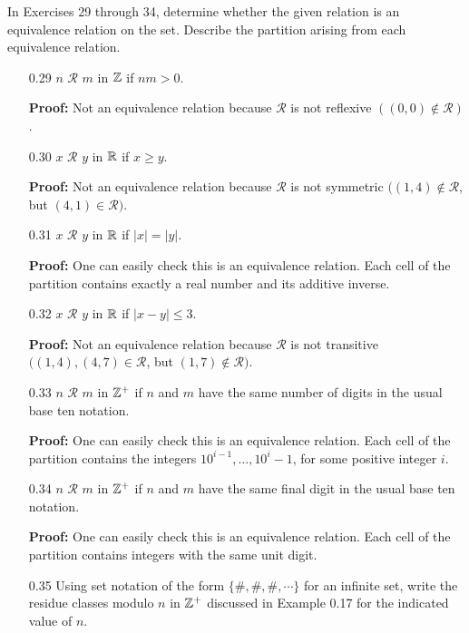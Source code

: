 \noindent In Exercises 29 through 34, determine whether the given relation is
an equivalence relation on the set. Describe the partition arising from each
equivalence relation.
\begin{enumerate}
   \item[0.29] $n$ $\mathscr{R}$ $m$ in $\mathbb{Z}$ if $nm > 0$.

      \textbf{Proof:} Not an equivalence relation because $\mathscr{R}$ is not
      reflexive $((0, 0) \notin \mathscr{R})$.
   \item[0.30] $x$ $\mathscr{R}$ $y$ in $\mathbb{R}$ if $x \ge y$.

      \textbf{Proof:} Not an equivalence relation because $\mathscr{R}$ is not
      symmetric $((1, 4) \notin \mathscr{R}$, but $(4, 1) \in \mathscr{R})$.
   \item[0.31] $x$ $\mathscr{R}$ $y$ in $\mathbb{R}$ if $|x| = |y|$.

      \textbf{Proof:} One can easily check this is an equivalence relation. Each
      cell of the partition contains exactly a real number and its additive
      inverse.
   \item[0.32] $x$ $\mathscr{R}$ $y$ in $\mathbb{R}$ if $|x - y| \le 3$.

      \textbf{Proof:} Not an equivalence relation because $\mathscr{R}$ is not
      transitive $((1, 4), (4, 7) \in \mathscr{R}$, but
      $(1, 7) \notin \mathscr{R})$.
   \item[0.33] $n$ $\mathscr{R}$ $m$ in $\mathbb{Z}^+$ if $n$ and $m$ have the same 
               number of digits in the usual base ten notation.

      \textbf{Proof:} One can easily check this is an equivalence relation. Each
      cell of the partition contains the integers $10^{i-1}, \ldots, 10^i - 1$,
      for some positive integer $i$.
   \item[0.34] $n$ $\mathscr{R}$ $m$ in $\mathbb{Z}^+$ if $n$ and $m$ have the same 
               final digit in the usual base ten notation.

      \textbf{Proof:} One can easily check this is an equivalence relation. Each
      cell of the partition contains integers with the same unit digit.
   \item[0.35] Using set notation of the form $\{\#,\#,\#,\cdots\}$ for an
               infinite set, write the residue classes modulo $n$ in $\mathbb{Z}^+$
               discussed in Example 0.17 for the indicated value of $n$.


\end{enumerate}
